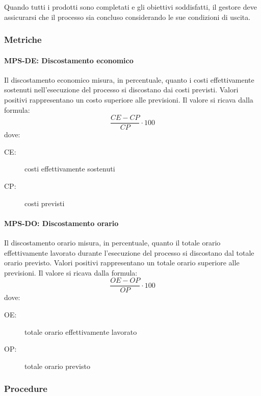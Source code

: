 \documentclass[../../norme-di-progetto.tex]{subfiles}
\begin{document}
Quando tutti i prodotti sono completati e gli obiettivi soddisfatti, il gestore deve assicurarsi che il processo sia concluso considerando le sue condizioni di uscita.

\subsubsection{Metriche}%
\label{subs:gestione-di-processo/metriche}

\paragraph{MPS-DE: Discostamento economico}%
\label{par:MPS-DE_discostamento_economico}

Il discostamento economico misura, in percentuale, quanto i costi effettivamente sostenuti nell'esecuzione del processo si discostano dai costi previsti.
Valori positivi rappresentano un costo superiore alle previsioni.
Il valore si ricava dalla formula:
\begin{equation}
  \frac{CE-CP}{CP}\cdot 100
\end{equation}
dove:
\begin{description}
  \item[CE:] costi effettivamente sostenuti
  \item[CP:] costi previsti
\end{description}

\paragraph{MPS-DO: Discostamento orario}%
\label{par:MPS-DO_discostamento_orario}

Il discostamento orario misura, in percentuale, quanto il totale orario effettivamente lavorato durante l'esecuzione del processo si discostano dal totale orario previsto.
Valori positivi rappresentano un totale orario superiore alle previsioni.
Il valore si ricava dalla formula:
\begin{equation}
  \frac{OE-OP}{OP}\cdot 100
\end{equation}
dove:
\begin{description}
  \item[OE:] totale orario effettivamente lavorato
  \item[OP:] totale orario previsto
\end{description}

\subsubsection{Procedure}%
\label{subs:gestione-di-processo/procedure}
\end{document}
